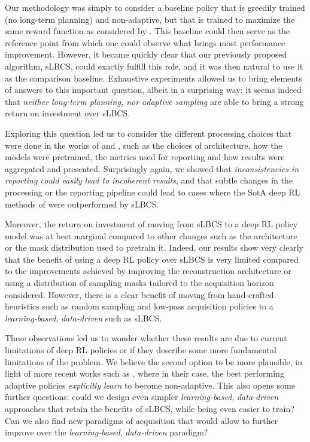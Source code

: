 Our methodology was simply to consider a baseline policy that is greedily trained (no long-term planning) and non-adaptive, but that is trained to maximize the same reward function as considered by \citet{pineda2020active,bakker2020experimental}. This baseline could then serve as the reference point from which one could observe what brings most performance improvement. However, it became quickly clear that our previously proposed algorithm, sLBCS, could exactly fulfill this role, and it was then natural to use it as the comparison baseline.  Exhaustive experiments allowed us to bring elements of answers to this important question, albeit in a surprising way: it seems indeed that \textit{neither long-term planning, nor adaptive sampling} are able to bring a strong return on investment over sLBCS. 

Exploring this question led us to consider the different processing choices that were done in the works of \citet{pineda2020active} and \citet{bakker2020experimental}, such as the choices of architecture, how the models were pretrained, the metrics used for reporting and how results were aggregated and presented. Surprisingly again, we showed that \textit{inconsistencies in reporting could easily lead to incoherent results}, and that subtle changes in the processing or the reporting pipeline could lead to cases where the SotA deep RL methods of \citet{pineda2020active,bakker2020experimental} were outperformed by sLBCS.


Moreover, the return on investment of moving from sLBCS to a deep RL policy model was at best marginal compared to other changes such as the architecture or the mask distribution used to pretrain it. Indeed, our results show very clearly that the benefit of using a deep RL policy over sLBCS is very limited compared to the improvements achieved by improving the reconstruction architecture or using a distribution of sampling masks tailored to the acquisition horizon considered. However, there is a clear benefit of moving from hand-crafted heuristics such as random sampling and low-pass acquisition policies to a \textit{learning-based}, \textit{data-driven} such as sLBCS. 

These observations led us to wonder whether these results are due to current limitations of deep RL policies or if they describe some more fundamental limitations of the problem. We believe the second option to be more plausible, in light of more recent works such as \citet{bakker2021learning}, where in their case, the best performing adaptive policies \textit{explicitly learn} to become non-adaptive. This also opens some further questions: could we design even simpler \textit{learning-based}, \textit{data-driven} approaches that retain the benefits of sLBCS, while being even easier to train? Can we also find new paradigms of acquisition that would allow to further improve over the \textit{learning-based}, \textit{data-driven} paradigm?



